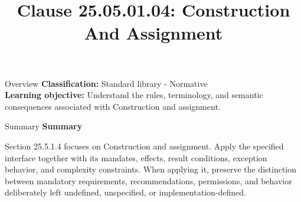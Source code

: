 \documentclass[10pt,letterpaper]{article}
\title{Clause 25.05.01.04: Construction And Assignment}
\author{}
\date{}
\begin{document}
\maketitle
\begin{CornellOverviewBox}{Overview}
\textbf{Classification:} Standard library - Normative\\[2pt]
\textbf{Learning objective:} Understand the rules, terminology, and semantic consequences associated with Construction and assignment.
\end{CornellOverviewBox}\begin{CornellSummaryBox}{Summary}
{\sffamily\bfseries\color{Accent} Summary}\par\vspace{3pt}Section 25.5.1.4 focuses on Construction and assignment. Apply the specified interface together with its mandates, effects, result conditions, exception behavior, and complexity constraints. When applying it, preserve the distinction between mandatory requirements, recommendations, permissions, and behavior deliberately left undefined, unspecified, or implementation-defined.
\end{CornellSummaryBox}
\end{document}
